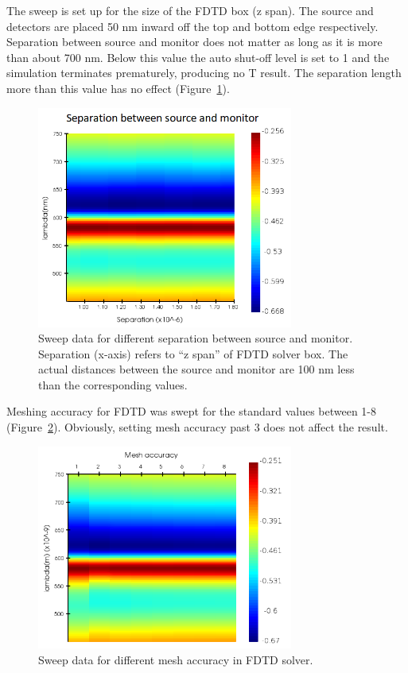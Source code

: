 \documentclass[11pt,a4paper]{article}
\begin{document}
The sweep is set up for the size of the FDTD box (z span). The source and detectors are placed 50 nm inward off the top and bottom edge respectively. Separation between source and monitor does not matter as long as it is more than about 700 nm.  Below this value the auto shut-off level is set to 1 and the simulation terminates prematurely, producing no T result. The separation length more than this value has no effect (Figure~\ref{fig:separation}).

\begin{figure}
    \centering
    \includegraphics[width=0.75\textwidth]{separation_sweep.png}
    \caption{Sweep data for different separation between source and monitor. Separation (x-axis) refers to ``z span'' of FDTD solver box. The actual distances between the source and monitor are 100 nm less than the corresponding values.}
    \label{fig:separation}
\end{figure}

Meshing accuracy for FDTD was swept for the standard values between 1-8 (Figure~\ref{fig:meshing}). Obviously, setting mesh accuracy past 3 does not affect the result.

\begin{figure}
    \centering
    \includegraphics[width=0.75\textwidth]{meshing_accuracy.png}
    \caption{Sweep data for different mesh accuracy in FDTD solver.}
    \label{fig:meshing}
\end{figure}
\end{document}
